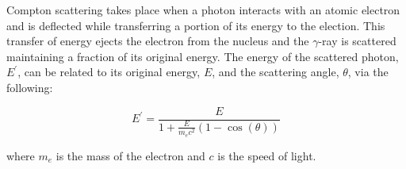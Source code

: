 \documentclass[cnatzke_thesis_proposal.tex]{subfiles}
\begin{document}
Compton scattering takes place when a photon interacts with an atomic electron and is deflected while transferring a portion of its energy to the election. 
This transfer of energy ejects the electron from the nucleus and the $\gamma$-ray is scattered maintaining a fraction of its original energy. 
The energy of the scattered photon, $E^{'}$, can be related to its original energy, $E$, and the scattering angle, $\theta$, via the following:

\begin{equation}
    E^{'} = \frac{E}{1 + \frac{E}{m_e c^2}(1 - \cos(\theta))}
\end{equation}

where $m_e$ is the mass of the electron and $c$ is the speed of light. 


\end{document}
